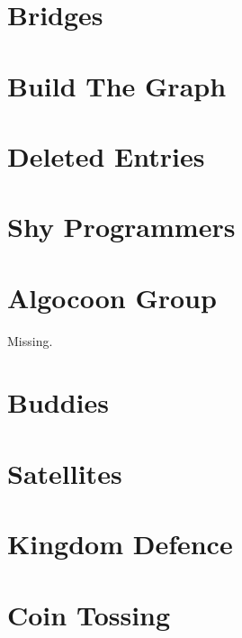 \documentclass[a4paper, 10pt]{article}
\let\stdsection\section
\renewcommand\section{\newpage\stdsection}
\newcommand{\includecode}[1]{
    }
\begin{document}
    \section{Bridges}
        \includecode{../problems/w04/Bridges/Bridges1_BGL.cpp}
        \includecode{../problems/w04/Bridges/Bridges1_Handmade.cpp}
        
    \section{Build The Graph}
        \includecode{../problems/w04/Build_The_Graph/BuildTheGraph1.cpp}
        
    \section{Deleted Entries}
        \includecode{../problems/w04/Deleted_Entries/DeletedEntries1.cpp}
    
    \section{Shy Programmers}
        \includecode{../problems/w04/Shy_Programmers/ShyProgrammers1.cpp}

    
    \section{Algocoon Group}
        Missing.
        
    \section{Buddies}
        \includecode{../problems/w05/Buddies/Buddies1.cpp}
        
    \section{Satellites}
        \includecode{../problems/w05/Satellites/Satellites1.cpp}
        
    \section{Kingdom Defence}
        \includecode{../problems/w05/Kingdom_Defense/KingdomDefence1.cpp}
    
    \section{Coin Tossing}
        \includecode{../problems/w05/Coin_Tossing/CoinToss1.cpp}
          
\end{document}
